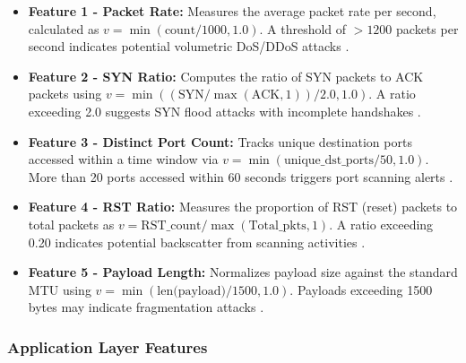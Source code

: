 \documentclass[12pt,a4paper]{report}
\begin{document}
\begin{itemize}
    \item \textbf{Feature 1 - Packet Rate:} Measures the average packet rate per second, calculated as $v = \min(\text{count} / 1000, 1.0)$. A threshold of $>1200$ packets per second indicates potential volumetric DoS/DDoS attacks \cite{nistSP800189,mahajanIMAP}.
    
    \item \textbf{Feature 2 - SYN Ratio:} Computes the ratio of SYN packets to ACK packets using $v = \min((\text{SYN} / \max(\text{ACK}, 1)) / 2.0, 1.0)$. A ratio exceeding 2.0 suggests SYN flood attacks with incomplete handshakes \cite{rfc4987,wangSYN2002}.
    
    \item \textbf{Feature 3 - Distinct Port Count:} Tracks unique destination ports accessed within a time window via $v = \min(\text{unique\_dst\_ports} / 50, 1.0)$. More than 20 ports accessed within 60 seconds triggers port scanning alerts \cite{jungPortscan2004}.
    
    \item \textbf{Feature 4 - RST Ratio:} Measures the proportion of RST (reset) packets to total packets as $v = \text{RST\_count} / \max(\text{Total\_pkts}, 1)$. A ratio exceeding 0.20 indicates potential backscatter from scanning activities \cite{paxsonBro1999}.
    
    \item \textbf{Feature 5 - Payload Length:} Normalizes payload size against the standard MTU using $v = \min(\text{len(payload)} / 1500, 1.0)$. Payloads exceeding 1500 bytes may indicate fragmentation attacks \cite{rfc894,rfc791}.
\end{itemize}

\subsubsection{Application Layer Features}
\end{document}
